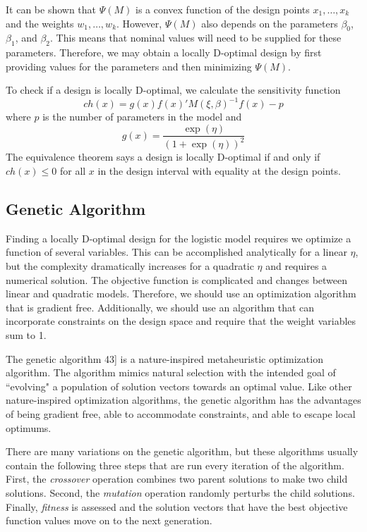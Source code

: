 \documentclass[11pt,a4paper]{article}
\begin{document}
It can be shown that $\Psi(M)$ is a convex function of the design points $x_1, \dots, x_k$ and  the weights $w_1, \dots, w_k$. However, $\Psi(M)$ also depends on the parameters $\beta_0$, $\beta_1$, and $\beta_2$. This means that nominal values will need to be supplied for these parameters. Therefore, we may obtain a locally D-optimal design by first providing values for the parameters and then minimizing $\Psi(M)$.

To check if a design is locally D-optimal, we calculate the sensitivity function
$$
ch(x) = g(x) f(x)'M(\xi, \beta)^{-1} f(x) - p
$$
where $p$ is the number of parameters in the model and
$$
g(x) = \frac{\exp(\eta)}{(1+\exp(\eta))^2}
$$
The equivalence theorem says a design is locally D-optimal if and only if $ch(x) \leq 0 $ for all $x$ in the design interval with equality at the design points.


\subsection{Genetic Algorithm}
Finding a locally D-optimal design for the logistic model requires we optimize a function of several variables. This can be accomplished analytically for a linear $\eta$, but the complexity dramatically increases for a quadratic $\eta$ and requires a numerical solution. The objective function is complicated and changes between linear and quadratic models. Therefore, we should use an optimization algorithm that is gradient free. Additionally, we should use an algorithm that can incorporate constraints on the design space and require that the weight variables sum to 1.

The genetic algorithm 43] is a nature-inspired metaheuristic optimization algorithm. The algorithm mimics natural selection with the intended goal of ``evolving" a population of solution vectors towards an optimal value. Like other nature-inspired optimization algorithms, the genetic algorithm has the advantages of being gradient free, able to accommodate constraints, and able to escape local optimums. 

There are many variations on the genetic algorithm, but these algorithms usually contain the following three steps that are run every iteration of the algorithm. First, the \textit{crossover} operation combines two parent solutions to make two child solutions. Second, the \textit{mutation} operation randomly perturbs the child solutions. Finally, \textit{fitness} is assessed and the solution vectors that have the best objective function values move on to the next generation.
\end{document}
